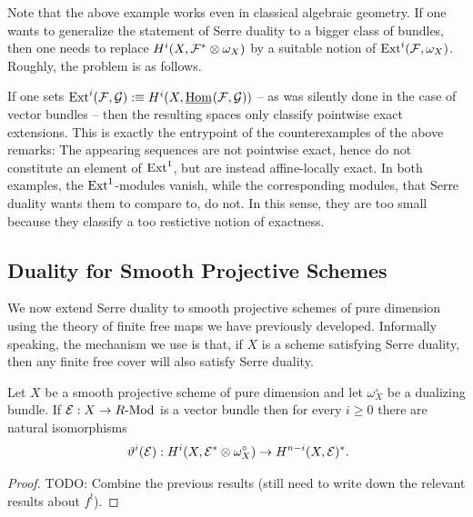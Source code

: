 Note that the above example works even in classical algebraic geometry.
If one wants to generalize the statement of Serre duality to a bigger class of bundles, then one needs to replace $H^i(X,\mathcal{F}^\ast \otimes \omega_X)$ by a suitable notion of $\mathrm{Ext}^i(\mathcal{F},\omega_X)$.
Roughly, the problem is as follows.

If one sets $\Ext^i(\mc F,\mc G) :\equiv H^i(X, \uHom(\mc F, \mc G))$ -- as was silently done in the case of vector bundles -- then the resulting spaces only classify pointwise exact extensions.
This is exactly the entrypoint of the counterexamples of the above remarks:
The appearing sequences are not pointwise exact, hence do not constitute an element of $\mathrm{Ext}^1$, but are instead affine-locally exact.
In both examples, the $\mathrm{Ext}^1$-modules vanish, while the corresponding modules, that Serre duality wants them to compare to, do not.
In this sense, they are too small because they classify a too restictive notion of exactness.




\subsection{Duality for Smooth Projective Schemes}

We now extend Serre duality to smooth projective schemes of pure dimension using the theory of finite free maps we have previously developed.
Informally speaking, the mechanism we use is that, if $X$ is a scheme satisfying Serre duality, then any finite free cover will also satisfy Serre duality.

\begin{proposition}
  Let $X$ be a smooth projective scheme of pure dimension and let $\omega^\circ_X$ be a dualizing bundle.
  If $\mathcal E : X \to R\text{-}\mathrm{Mod}$ is a vector bundle then for every $i\geq 0$ there are natural isomorphisms
  \[
    \vartheta^i(\mathcal E) : H^i(X, \mathcal E^\ast \otimes \omega^\circ_X) \to H^{n-i}(X,\mathcal E)^\ast \rlap{.}
  \]
\end{proposition}

\begin{proof}
  {\color{red} TODO: Combine the previous results (still need to write down the relevant results about $f^!$).}
\end{proof}
